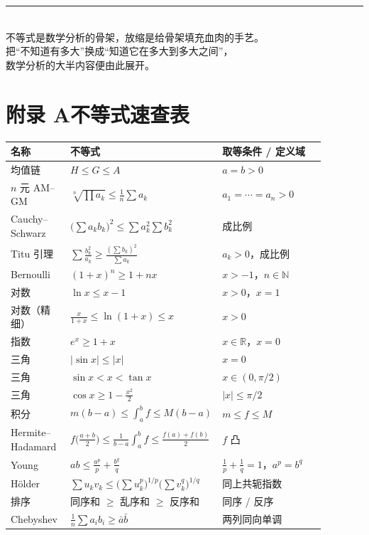 \documentclass[11pt,a4paper]{ctexart}
\providecommand{\kaishu}{}
\renewcommand{\kaishu}{\CJKfamily{kai}}
\theoremstyle{definition}
\theoremstyle{remark}
\newcommand{\R}{\mathbb{R}}
\newcommand{\N}{\mathbb{N}}
\newcommand{\abs}[1]{\left\lvert #1 \right\rvert}
\begin{document}
\vfill

\begin{center}
{\color{mainc}\rule{0.4\linewidth}{0.8pt}}\\[6pt]
{\kaishu\small 不等式是数学分析的骨架，放缩是给骨架填充血肉的手艺。\\[2pt]
把“不知道有多大”换成“知道它在多大到多大之间”，\\[2pt]
数学分析的大半内容便由此展开。}
\end{center}

\newpage

\appendix
\section*{附录 A\quad 不等式速查表}

\renewcommand{\arraystretch}{1.45}
\begin{table}[H]
\centering
\small
\begin{tabular}{@{}p{0.19\linewidth}p{0.36\linewidth}p{0.33\linewidth}@{}}
\toprule
\textbf{名称} & \textbf{不等式} & \textbf{取等条件 / 定义域} \\
\midrule
均值链 & $H\le G\le A$ & $a=b>0$ \\
$n$ 元 AM–GM & $\sqrt[n]{\prod a_k}\le\frac1n\sum a_k$ & $a_1=\cdots=a_n>0$ \\
Cauchy–Schwarz & $\big(\sum a_kb_k\big)^2\le\sum a_k^2\sum b_k^2$ & 成比例 \\
Titu 引理 & $\sum\frac{b_k^2}{a_k}\ge\frac{(\sum b_k)^2}{\sum a_k}$ & $a_k>0$，成比例 \\
Bernoulli & $(1+x)^n\ge1+nx$ & $x>-1$，$n\in\N$ \\
对数 & $\ln x\le x-1$ & $x>0$，$x=1$ \\
对数（精细） & $\frac{x}{1+x}\le\ln(1+x)\le x$ & $x>0$ \\
指数 & $e^x\ge1+x$ & $x\in\R$，$x=0$ \\
三角 & $\abs{\sin x}\le\abs x$ & $x=0$ \\
三角 & $\sin x<x<\tan x$ & $x\in(0,\pi/2)$ \\
三角 & $\cos x\ge1-\frac{x^2}{2}$ & $\abs x\le\pi/2$ \\
积分 & $m(b-a)\le\int_a^bf\le M(b-a)$ & $m\le f\le M$ \\
Hermite–Hadamard & $f\big(\frac{a+b}2\big)\le\frac1{b-a}\int_a^bf\le\frac{f(a)+f(b)}2$ & $f$ 凸 \\
Young & $ab\le\frac{a^p}{p}+\frac{b^q}{q}$ & $\frac1p+\frac1q=1$，$a^p=b^q$ \\
Hölder & $\sum u_kv_k\le\big(\sum u_k^p\big)^{1/p}\big(\sum v_k^q\big)^{1/q}$ & 同上共轭指数 \\
排序 & 同序和 $\ge$ 乱序和 $\ge$ 反序和 & 同序 / 反序 \\
Chebyshev & $\frac1n\sum a_ib_i\ge\bar a\bar b$ & 两列同向单调 \\
\bottomrule
\end{tabular}
\end{table}
\end{document}
